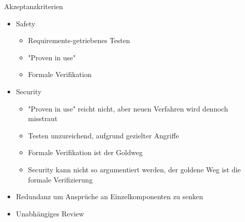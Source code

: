 \begin{frame}[T]{Akzeptanzkriterien}
  \begin{itemize}
    \item Safety
    \begin{itemize}
      \item Requirements-getriebenes Testen %
      \item "Proven in use" %
      \item Formale Verifikation %
    \end{itemize}

    \item Security
    \begin{itemize}
      \item "Proven in use" reicht nicht, aber neuen Verfahren wird dennoch misstraut
      \item Testen unzureichend, aufgrund gezielter Angriffe
      \item Formale Verifikation ist der Goldweg
      \item Security kann nicht so argumentiert werden, der goldene Weg ist die formale Verifizierung
    \end{itemize}

    \item Redundanz um Ansprüche an Einzelkomponenten zu senken
    \item Unabhängiges Review
  \end{itemize}
\end{frame}
